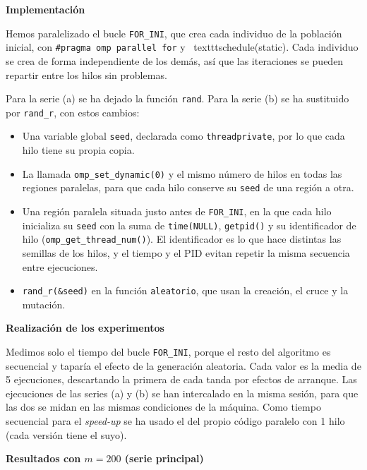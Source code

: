 \documentclass[12pt]{article}
\begin{document}
\begin{enumerate}
\medskip
\noindent\textbf{Implementación}\par
\smallskip
 
Hemos paralelizado el bucle \texttt{FOR\_INI}, que crea cada
 individuo de la población inicial, con \texttt{\#pragma omp parallel for} y \
 texttt{schedule(static)}. Cada individuo se crea de forma independiente de los
  demás, así que las iteraciones se pueden repartir entre los hilos sin problemas.
    
Para la serie (a) se ha dejado la función \texttt{rand}. Para la serie (b) se ha 
sustituido por \texttt{rand\_r}, con estos cambios:
 
\begin{itemize}
    \item Una variable global \texttt{seed}, declarada como \texttt{threadprivate}, por lo que cada hilo tiene su propia copia.
    \item La llamada \texttt{omp\_set\_dynamic(0)} y el mismo número de hilos en todas las regiones paralelas, para que cada hilo conserve su \texttt{seed} de una región a otra.
    \item Una región paralela situada justo antes de \texttt{FOR\_INI}, en la que cada hilo inicializa su \texttt{seed} con la suma de \texttt{time(NULL)}, \texttt{getpid()} y su identificador de hilo (\texttt{omp\_get\_thread\_num()}). El identificador es lo que hace distintas las semillas de los hilos, y el tiempo y el PID evitan repetir la misma secuencia entre ejecuciones.
    \item \texttt{rand\_r(\&seed)} en la función \texttt{aleatorio}, que usan la creación, el cruce y la mutación.
\end{itemize}
 
\medskip
\noindent\textbf{Realización de los experimentos}\par
\smallskip
 
Medimos solo el tiempo del bucle \texttt{FOR\_INI}, 
porque el resto del algoritmo es secuencial y taparía 
el efecto de la generación aleatoria. Cada valor es la 
media de 5 ejecuciones, descartando la primera de cada tanda 
por efectos de arranque. Las ejecuciones de las series (a) y (b) 
se han intercalado en la misma sesión, para que las dos se midan en las 
mismas condiciones de la máquina. Como tiempo secuencial para el 
\textit{speed-up} se ha usado el del propio código paralelo con 1 hilo (cada versión tiene el suyo).
 
\medskip
\noindent\textbf{Resultados con $m=200$ (serie principal)}\par
\smallskip
 

\end{enumerate}
\end{document}

